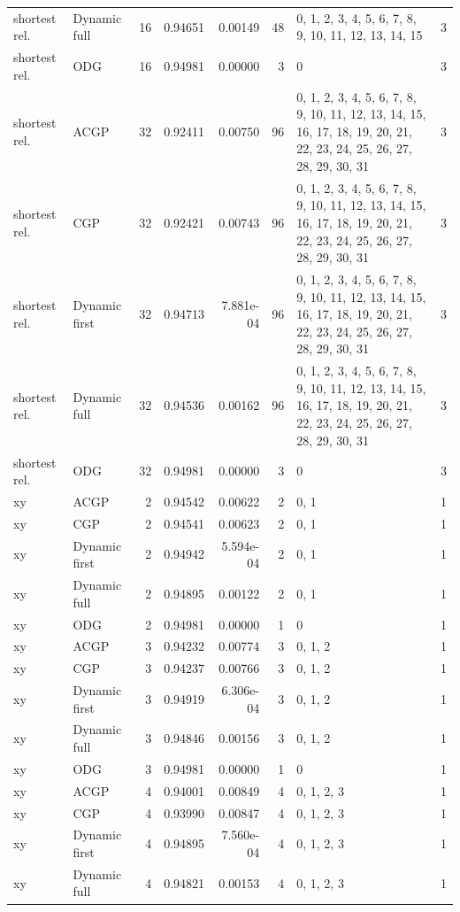 \documentclass[10pt,a4paper]{article}
\begin{document}
\begin{longtable}{@{}p{23mm}p{29mm}rrrrp{36mm}r@{}}
shortest rel. & Dynamic full & 16 & 0.94651 & 0.00149 & 48 & 0, 1, 2, 3, 4, 5, 6, 7, 8, 9, 10, 11, 12, 13, 14, 15 & 3 \\
shortest rel. & ODG & 16 & 0.94981 & 0.00000 & 3 & 0 & 3 \\
shortest rel. & ACGP & 32 & 0.92411 & 0.00750 & 96 & 0, 1, 2, 3, 4, 5, 6, 7, 8, 9, 10, 11, 12, 13, 14, 15, 16, 17, 18, 19, 20, 21, 22, 23, 24, 25, 26, 27, 28, 29, 30, 31 & 3 \\
shortest rel. & CGP & 32 & 0.92421 & 0.00743 & 96 & 0, 1, 2, 3, 4, 5, 6, 7, 8, 9, 10, 11, 12, 13, 14, 15, 16, 17, 18, 19, 20, 21, 22, 23, 24, 25, 26, 27, 28, 29, 30, 31 & 3 \\
shortest rel. & Dynamic first & 32 & 0.94713 & 7.881e-04 & 96 & 0, 1, 2, 3, 4, 5, 6, 7, 8, 9, 10, 11, 12, 13, 14, 15, 16, 17, 18, 19, 20, 21, 22, 23, 24, 25, 26, 27, 28, 29, 30, 31 & 3 \\
shortest rel. & Dynamic full & 32 & 0.94536 & 0.00162 & 96 & 0, 1, 2, 3, 4, 5, 6, 7, 8, 9, 10, 11, 12, 13, 14, 15, 16, 17, 18, 19, 20, 21, 22, 23, 24, 25, 26, 27, 28, 29, 30, 31 & 3 \\
shortest rel. & ODG & 32 & 0.94981 & 0.00000 & 3 & 0 & 3 \\
xy & ACGP & 2 & 0.94542 & 0.00622 & 2 & 0, 1 & 1 \\
xy & CGP & 2 & 0.94541 & 0.00623 & 2 & 0, 1 & 1 \\
xy & Dynamic first & 2 & 0.94942 & 5.594e-04 & 2 & 0, 1 & 1 \\
xy & Dynamic full & 2 & 0.94895 & 0.00122 & 2 & 0, 1 & 1 \\
xy & ODG & 2 & 0.94981 & 0.00000 & 1 & 0 & 1 \\
xy & ACGP & 3 & 0.94232 & 0.00774 & 3 & 0, 1, 2 & 1 \\
xy & CGP & 3 & 0.94237 & 0.00766 & 3 & 0, 1, 2 & 1 \\
xy & Dynamic first & 3 & 0.94919 & 6.306e-04 & 3 & 0, 1, 2 & 1 \\
xy & Dynamic full & 3 & 0.94846 & 0.00156 & 3 & 0, 1, 2 & 1 \\
xy & ODG & 3 & 0.94981 & 0.00000 & 1 & 0 & 1 \\
xy & ACGP & 4 & 0.94001 & 0.00849 & 4 & 0, 1, 2, 3 & 1 \\
xy & CGP & 4 & 0.93990 & 0.00847 & 4 & 0, 1, 2, 3 & 1 \\
xy & Dynamic first & 4 & 0.94895 & 7.560e-04 & 4 & 0, 1, 2, 3 & 1 \\
xy & Dynamic full & 4 & 0.94821 & 0.00153 & 4 & 0, 1, 2, 3 & 1 \\

\end{longtable}
\end{document}
